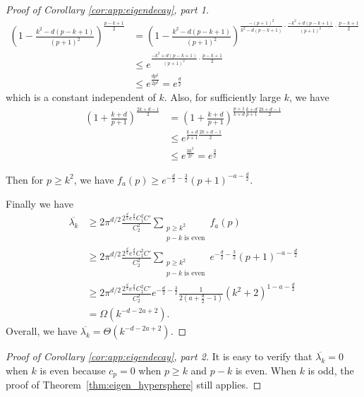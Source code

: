 \begin{proof}[Proof of Corollary \ref{cor:app:eigendecay}, part 1]
\begin{align*}
    \left(1-\frac{k^2-d(p-k+1)}{(p+1)^2}\right)^{\frac{p-k+1}{2}}&= \left(1-\frac{k^2-d(p-k+1)}{(p+1)^2}\right)^{\frac{-(p+1)^2}{k^2-d(p-k+1)}\cdot\frac{-k^2+d(p-k+1)}{(p+1)^2}\cdot\frac{p-k+1}{2}}\\
    &\leq e^{\frac{-k^2+d(p-k+1)}{(p+1)^2}\cdot\frac{p-k+1}{2}}\\
    &\leq e^{\frac{dp^2}{2p^2}}=e^{\frac{d}{2}}
\end{align*} 
which is a constant independent of $k$. 
Also, for sufficiently large $k$, we have 
\begin{align*}
    \left({1+\frac{k+d}{p+1}}\right)^{\frac{2k+d-1}{2}}&= \left({1+\frac{k+d}{p+1}}\right)^{\frac{p+1}{k+d}\frac{k+d}{p+1}\frac{2k+d-1}{2}}\\
    &\leq e^{\frac{k+d}{p+1}\frac{2k+d-1}{2}}\\
    &\leq e^{\frac{3k^2}{2r}}=e^{\frac{3}{2}}
\end{align*}

Then for $p \geq k^2$, we have $f_a(p)\geq e^{-\frac{d}{2}-\frac{3}{2}}(p+1)^{-a-\frac{d}{2}}$.

Finally we have 
\begin{align}
\overline{\lambda_k} 
&\geq 2\pi^{d/2}\frac{2^{\frac{d}{2}}e^{\frac{d}{2}}C_1^2C'}{C_2^2}\sum_{\substack{p\geq k^2\\p-k\text{ is even}}} f_a(p)\\
&\geq 2\pi^{d/2}\frac{2^{\frac{d}{2}}e^{\frac{d}{2}}C_1^2C'}{C_2^2}\sum_{\substack{p\geq k^2\\p-k\text{ is even}}} e^{-\frac{d}{2}-\frac{3}{2}}(p+1)^{-a-\frac{d}{2}}\\
&\geq 2\pi^{d/2}\frac{2^{\frac{d}{2}}e^{\frac{d}{2}}C_1^2C'}{C_2^2} e^{-\frac{d}{2}-\frac{3}{2}}\frac{1}{2(a+\frac{d}{2}-1)}(k^2+2)^{1-a-\frac{d}{2}}\\
&=\Omega(k^{-d-2a+2}).
\end{align}
Overall, we have $\overline{\lambda_k} =\Theta(k^{-d-2a+2})$.
\end{proof}
\begin{proof}[Proof of Corollary \ref{cor:app:eigendecay}, part 2]
It is easy to verify that $\overline{\lambda_k}=0$ when $k$ is even because $c_p=0$ when $p\geq k$ and $p-k$ is even. When $k$ is odd, the proof of Theorem~\ref{thm:eigen_hypersphere} still applies.
\end{proof}

